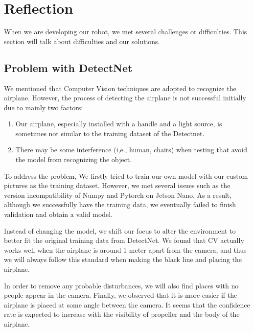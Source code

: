 \section{Reflection}{

When we are developing our robot, we met several challenges or difficulties. This section will talk about difficulties and our solutions.

\subsection{Problem with DetectNet}{
We mentioned that Computer Vision techniques are adopted to recognize the airplane. However, the process of detecting the airplane is not successful initially due to mainly two factors: 
\begin{enumerate}
    \item 
    Our airplane, especially installed with a handle and a light source, is sometimes not similar to the training dataset of the Detectnet. 
    \item
    There may be some interference (i,e., human, chairs) when testing that avoid the model from recognizing the object. 
\end{enumerate}

To address the problem, We firstly tried to train our own model with our custom pictures as the training dataset. However, we met several issues such as the version incompatibility of Numpy and Pytorch on Jetson Nano. As a result, although we successfully have the training data, we eventually failed to finish validation and obtain a valid model.

Instead of changing the model, we shift our focus to alter the environment to better fit the original training data from DetectNet. 
We found that CV actually works well when the airplane is around 1 meter apart from the camera, and thus we will always follow this standard when making the black line and placing the airplane.

In order to remove any probable disturbances, we will also find places with no people appear in the camera. Finally, we observed that it is more easier if the airplane is placed at some angle between the camera. It seems that the confidence rate is expected to increase with the visibility of propeller and the body of the airplane.


}

}
